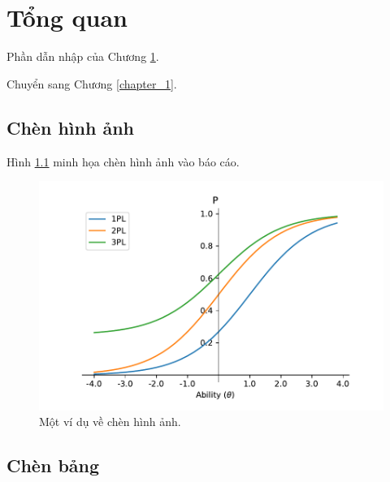 \chapter{Tổng quan}\label{chapter_2}

Phần dẫn nhập của Chương \ref{chapter_2}.

Chuyển sang Chương \ref{chapter_1}.

\section{Chèn hình ảnh}

Hình \ref{icc_plot} minh họa chèn hình ảnh vào báo cáo.
 
\begin{center}
    \begin{figure}[h!]
    \begin{center}
     \includegraphics[scale=0.5]{figs/ICC_plots.pdf}
    \end{center}
    \caption{Một ví dụ về chèn hình ảnh.}
    \label{icc_plot}
    \end{figure}
\end{center}

\section{Chèn bảng}


